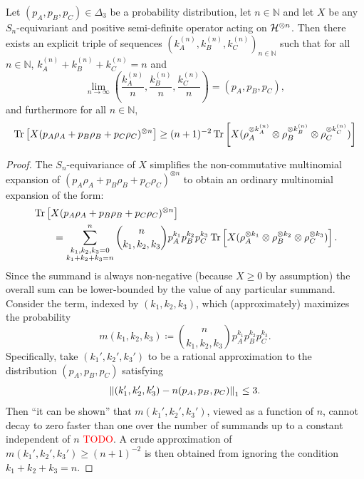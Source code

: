\documentclass[notitlepage]{article}
\begin{document}
\begin{lem}
    Let $(p_A, p_B, p_C) \in \Delta_3$ be a probability distribution, let $n \in \mathbb N$ and let $X$ be any $S_n$-equivariant and positive semi-definite operator acting on $\mathcal H^{\otimes n}$.
    Then there exists an explicit triple of sequences $(k_A^{(n)}, k_B^{(n)}, k_C^{(n)})_{n \in \mathbb N}$ such that for all $n \in \mathbb N$, $k_{A}^{(n)} + k_{B}^{(n)} + k_{C}^{(n)} = n$ and
    \begin{equation}
        \lim_{n \to \infty} \left( \frac{k_A^{(n)}}{n}, \frac{k_B^{(n)}}{n}, \frac{k_C^{(n)}}{n} \right) = (p_A, p_B, p_C),
    \end{equation}
    and furthermore for all $n \in \mathbb N$,
    \begin{equation}
        \operatorname{Tr}\left[X (p_{A} \rho_{A} + p_{B} \rho_{B} + p_{C} \rho_{C})^{\otimes n} \right] \geq (n+1)^{-2} \operatorname{Tr}\left[X (\rho_{A}^{\otimes k_A^{(n)}} \otimes \rho_{B}^{\otimes k_B^{(n)}} \otimes \rho_{C}^{\otimes k_C^{(n)}}) \right]
    \end{equation}
\end{lem}
\begin{proof}
    The $S_n$-equivariance of $X$ simplifies the non-commutative multinomial expansion of $(p_{A} \rho_{A} + p_{B} \rho_{B} + p_{C} \rho_{C})^{\otimes n}$ to obtain an ordinary multinomial expansion of the form:
    \begin{align}
        \begin{split}
            &\operatorname{Tr}\left[X (p_{A} \rho_{A} + p_{B} \rho_{B} + p_{C} \rho_{C})^{\otimes n} \right] \\
            &\qquad= \sum_{\substack{k_1, k_2, k_3 = 0\\ k_1 + k_2 + k_3 = n}}^{n} \binom{n}{k_1, k_2, k_3} p_{A}^{k_1} p_{B}^{k_2} p_{C}^{k_3} \operatorname{Tr}\left[X (\rho_{A}^{\otimes k_1} \otimes \rho_{B}^{\otimes k_2} \otimes \rho_{C}^{\otimes k_3}) \right].
        \end{split}
    \end{align}
    Since the summand is always non-negative (because $X \geq 0$ by assumption) the overall sum can be lower-bounded by the value of any particular summand.
    Consider the term, indexed by $(k_1, k_2, k_3)$, which (approximately) maximizes the probability 
    \begin{equation}
        m(k_1, k_2, k_3) \coloneqq \binom{n}{k_1, k_2, k_3} p_{A}^{k_1} p_{B}^{k_2} p_{C}^{k_3}.
    \end{equation}
    Specifically, take $(k_1', k_2', k_3')$ to be a rational approximation to the distribution $(p_A, p_B, p_C)$ satisfying
    \begin{equation}
        \left\lVert(k_1', k_2', k_3') - n (p_{A}, p_{B}, p_{C})\right\rVert_{1} \leq 3.
    \end{equation}
    Then ``it can be shown'' that $m(k_1', k_2', k_3')$, viewed as a function of $n$, cannot decay to zero faster than one over the number of summands up to a constant independent of $n$ \textcolor{red}{TODO}.
    A crude approximation of $m(k_1', k_2', k_3') \geq (n+1)^{-2}$ is then obtained from ignoring the condition $k_1 + k_2 + k_3 = n$.
\end{proof}
\end{document}
